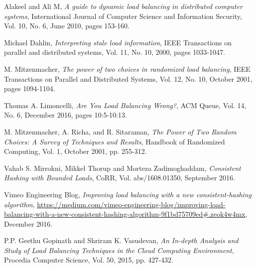 


%
%
%
\begin{thebibliography}{1}

Alakeel and Ali M, \emph{A guide to dynamic load balancing in distributed
  computer systems}, International Journal of Computer Science and Information
  Security, Vol. 10, No. 6, June 2010, pages 153-160.

Michael Dahlin, \emph{Interpreting stale load information},
  IEEE Transactions on parallel and distributed systems,
  Vol. 11, No. 10, 2000, pages 1033-1047.

M. Mitzenmacher, \emph{The power of two choices in randomized load balancing},
  IEEE Transactions on Parallel and Distributed Systems,
  Vol. 12, No. 10, October 2001, pages 1094-1104.

  Thomas A. Limoncelli, \emph{Are You Load Balancing Wrong?},
  ACM Queue,
  Vol. 14, No. 6, December 2016, pages 10:5-10:13.

M. Mitzenmacher, A. Richa, and R. Sitaraman,
  \emph{The Power of Two Random Choices: A Survey of Techniques and Results},
  Handbook of Randomized Computing,
  Vol. 1, October 2001, pp. 255-312.

Vahab S. Mirrokni, Mikkel Thorup and Morteza Zadimoghaddam,
  \emph{Consistent Hashing with Bounded Loads},
  CoRR,
  Vol. abs/1608.01350, September 2016.

Vimeo Engineering Blog, \emph{Improving load balancing with a new consistent-hashing algorithm},
  \url{https://medium.com/vimeo-engineering-blog/improving-load-balancing-with-a-new-consistent-hashing-algorithm-9f1bd75709ed#.zeok4w4mx},
  December 2016.

  P.P. Geethu Gopinath and Shriram K. Vasudevan, \emph{An In-depth Analysis and Study of Load Balancing Techniques in the Cloud Computing Environment},
  Procedia Computer Science,
  Vol. 50, 2015, pp. 427-432.

\end{thebibliography}
